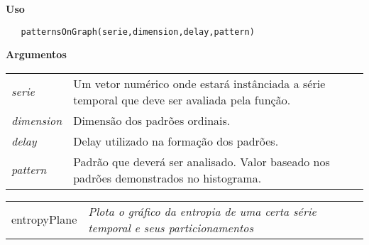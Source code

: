 \documentclass[12pt,letterpaper]{article}
\begin{document}
\vspace{-0.5cm}

\hrulefill  

\vspace{0.5cm}

\textbf{Uso}

\begin{lstlisting}
   patternsOnGraph(serie,dimension,delay,pattern)
\end{lstlisting}

\vspace{0.5cm}

\textbf{Argumentos}

\begin{table}[!h]
\begin{center}
\begin{tabularx}{\textwidth}{X X}
\hspace{0.5cm} \textit{serie} \vspace{0.5cm}& Um vetor numérico onde estará instânciada a série temporal que deve ser avaliada pela função.\vspace{0.5cm}\\
\hspace{0.5cm} \textit{dimension} \vspace{0.5cm}& Dimensão dos padrões ordinais.\vspace{0.5cm}\\
\hspace{0.5cm} \textit{delay} \vspace{0.5cm}& Delay utilizado na formação dos padrões.\vspace{0.5cm}\\
\hspace{0.5cm} \textit{pattern} \vspace{0.5cm}& Padrão que deverá ser analisado. Valor baseado nos padrões demonstrados no histograma.\vspace{0.5cm}\\
\end{tabularx}
\end{center}
\end{table} 
\newpage

\hrulefill   

\begin{table}[!h]
\begin{center}
\begin{tabularx}{\textwidth}{ X X}
\hspace{0.5cm} entropyPlane & \textit{Plota o gráfico da entropia de uma certa série temporal e seus particionamentos}\\
\end{tabularx}
\end{center}
\end{table} 
\end{document}
